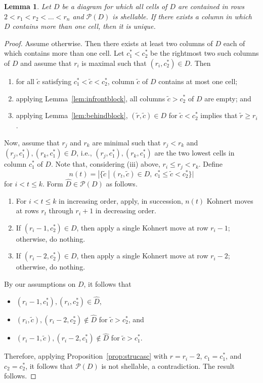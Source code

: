 \documentclass[letterpaper,10pt]{article}
\newtheorem{lemma}[theorem]{Lemma}
\begin{document}
\begin{lemma}\label{lem:onecol}
    Let $D$ be a diagram for which all cells of $D$ are contained in rows $2<r_1<r_2<\hdots<r_n$ and $\mathcal{P}(D)$ is shellable. If there exists a column in which $D$ contains more than one cell, then it is unique.
\end{lemma}
\begin{proof}
    Assume otherwise. Then there exists at least two columns of $D$ each of which contains more than one cell. Let $c^*_1<c^*_2$ be the rightmost two such columns of $D$ and assume that $r_i$ is maximal such that $(r_i,c_2^*)\in D$. Then 
    \begin{enumerate}
        \item[(i)] for all $\tilde{c}$ satisfying $c^*_1<\tilde{c}<c^*_2$, column $\tilde{c}$ of $D$ contains at most one cell;
        \item[(ii)] applying Lemma~\ref{lem:infrontblock}, all columns $\tilde{c}>c^*_2$ of $D$ are empty; and
        \item[(iii)] applying Lemma~\ref{lem:behindblock}, $(\tilde{r},\tilde{c})\in D$ for $\tilde{c}<c_2^*$ implies that $\tilde{r}\ge r_i$.
    \end{enumerate}
    Now, assume that $r_j$ and $r_k$ are minimal such that $r_j<r_k$ and $(r_j,c^*_1),(r_k,c^*_1)\in D$, i.e., $(r_j,c^*_1),(r_k,c^*_1)$ are the two lowest cells in column $c_1^*$ of $D$. Note that, considering (iii) above, $r_i\le r_j<r_k$. Define $$n(t)=|\{\tilde{c}~|~(r_t,\tilde{c})\in D,~c^*_1\le\tilde{c}<c^*_2\}|$$ for $i< t\le k$. Form $\widehat{D}\in \mathcal{P}(D)$ as follows.
    \begin{enumerate}
        \item[1)] For $i<t\le k$ in increasing order, apply, in succession, $n(t)$ Kohnert moves at rows $r_t$ through $r_i+1$ in decreasing order.
        \item[2)] If $(r_i-1,c_2^*)\in D$, then apply a single Kohnert move at row $r_i-1$; otherwise, do nothing.
        \item[3)] If $(r_i-2,c_2^*)\in D$, then apply a single Kohnert move at row $r_i-2$; otherwise, do nothing.
    \end{enumerate}
    By our assumptions on $D$, it follows that
    \begin{itemize}
        \item $(r_i-1,c^*_1),(r_i,c^*_2)\in \widehat{D}$,
        \item $(r_i,\tilde{c}), (r_i-2,c^*_2)\notin \widehat{D}$ for $\tilde{c}>c^*_2$, and
        \item $(r_i-1,\tilde{c}),(r_i-2,c^*_1)\notin \widehat{D}$ for $\tilde{c}>c^*_1$.
    \end{itemize}
    Therefore, applying Proposition~\ref{prop:strucasc} with $r=r_i-2$, $c_1=c^*_1$, and $c_2=c^*_2$, it follows that $\mathcal{P}(D)$ is not shellable, a contradiction. The result follows.
\end{proof}
\end{document}
